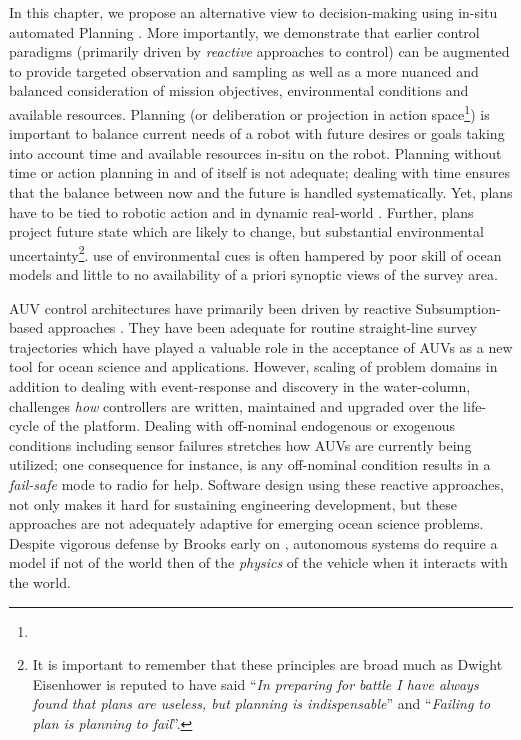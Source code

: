 In this chapter, we propose an alternative view to decision-making
using in-situ automated Planning \cite{ghallab04}. More importantly,
we demonstrate that earlier control paradigms (primarily driven by
\emph{reactive} approaches to control) can be augmented to provide
targeted observation and sampling as well as a more nuanced and
balanced consideration of mission objectives, environmental conditions
and available resources. Planning (or deliberation or projection in
action space\footnote{}) is important to
balance current needs of a robot with future desires or goals taking
into account time and available resources in-situ on the
robot. Planning without time or action planning in and of itself is
not adequate; dealing with time ensures that the balance between now
and the future is handled systematically. Yet, plans have to be tied
to robotic action and in dynamic real-world
. Further, plans  project
future state which are likely to change, but  substantial environmental uncertainty\footnote{It is important
  to remember that these principles are broad much as Dwight
  Eisenhower is reputed to have said ``\emph{In preparing for battle I
    have always found that plans are useless, but planning is
    indispensable}'' and ``\emph{Failing to plan is planning to
    fail}''.}.  use of
environmental cues is often hampered by poor 
skill \cite{anderson2009} of ocean models and little to no
availability of a priori synoptic views of the survey
area. 


 AUV control architectures have primarily been
driven by reactive Subsumption-based approaches \cite{brooks86}. They
have been adequate for routine straight-line survey trajectories which
have played a valuable role in the acceptance of AUVs as a new tool
for ocean science and  applications. However,
scaling of problem domains in addition to dealing with event-response
and discovery in the water-column, challenges \emph{how} controllers
are written, maintained and upgraded over the life-cycle of the
platform. Dealing with off-nominal endogenous or exogenous conditions
including sensor failures stretches how AUVs are currently being
utilized; one consequence for instance, is any off-nominal condition
results in a \emph{fail-safe}  mode to radio for
help. Software design using these reactive approaches, not only makes
it hard for sustaining engineering development, but these approaches
are not adequately adaptive for emerging ocean science problems.
Despite vigorous defense by Brooks early on
\cite{Brooks91intelligencewithoutrea,Brooks91intelligencewithoutrep},
autonomous systems do require a model if not of the world then of the
\emph{physics} of the vehicle when it interacts with the world.


